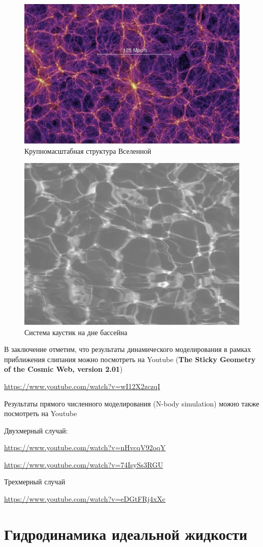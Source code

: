 \begin{figure}[H]
	\centering
	\includegraphics[width=.6\linewidth]{photo/1.jpg}
	\caption{Крупномасштабная структура Вселенной}
	\label{fig:figure1}
\end{figure}
\begin{figure}[H]
	\centering
	\includegraphics[width=.6\linewidth]{photo/2.png}
	\caption{Система каустик на дне бассейна}
	\label{fig:figure2}
\end{figure}
В заключение отметим, что результаты динамического моделирования в рамках приближения слипания можно посмотреть на Youtube (\textbf{The Sticky Geometry of the Cosmic Web, version 2.01})

\url{https://www.youtube.com/watch?v=wI12X2zczqI}

Результаты прямого численного моделирования (N-body simulation) можно также  посмотреть на Youtube

Двухмерный случай:

\url{https://www.youtube.com/watch?v=nHvcqV92oqY}

\url{https://www.youtube.com/watch?v=74IsySs3RGU}

Трехмерный случай

\url{https://www.youtube.com/watch?v=eDGtFRj4xXc}


\newpage
\section{Гидродинамика идеальной жидкости}

